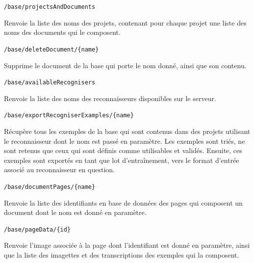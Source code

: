 \begin{description}[align=left]

\item [Général]

\item [GET] \texttt{/base/projectsAndDocuments}\newline{}
\begin{itshape}
Renvoie la liste des noms des projets, contenant pour chaque projet une liste des noms des documents qui le composent.
\end{itshape}

\item [DELETE] \texttt{/base/deleteDocument/\{name\}}\newline{}
\begin{itshape}
Supprime le document de la base qui porte le nom donné, ainsi que son contenu.
\end{itshape}

\item [GET] \texttt{/base/availableRecognisers}\newline{}
\begin{itshape}
Renvoie la liste des noms des reconnaisseurs disponibles sur le serveur.
\end{itshape}

\item [POST] \texttt{/base/exportRecogniserExamples/\{name\}}\newline{}
\begin{itshape}
Récupère tous les exemples de la base qui sont contenus dans des projets utilisant le reconnaisseur dont le nom est passé en paramètre. Les exemples sont triés, ne sont retenus que ceux qui sont définis comme utilisables et validés. Ensuite, ces exemples sont exportés en tant que lot d'entraînement, vers le format d'entrée associé au reconnaisseur en question.
\end{itshape}

\item [Annotation / Validation]

\item [GET] \texttt{/base/documentPages/\{name\}}\newline{}
\begin{itshape}
Renvoie la liste des identifiants en base de données des pages qui composent un document dont le nom est donné en paramètre.
\end{itshape}

\item [GET] \texttt{/base/pageData/\{id\}}\newline{}
\begin{itshape}
Renvoie l'image associée à la page dont l'identifiant est donné en paramètre, ainsi que la liste des imagettes et des transcriptions des exemples qui la composent.
\end{itshape}


\end{description}
